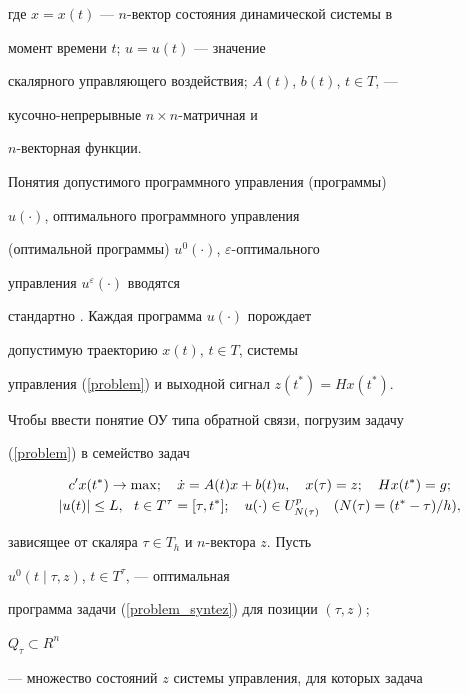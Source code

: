 где $x = x(t)$ --- $n$-вектор состояния динамической системы в


момент времени $t$; $u = u(t)$ --- значение


скалярного управляющего воздействия; $A(t)$, $b(t)$, $t \in T$, ---


кусочно-непрерывные $n \times n$-матричная и


$n$-векторная функции.





Понятия допустимого программного управления (программы)


$u(\cdot)$, оптимального програм\-много управления


(оптимальной программы) $u^0(\cdot)$, $\varepsilon$-оптимального


управления $u^\varepsilon(\cdot)$ вводятся


стандартно \cite{KMO2}. Каждая программа $u(\cdot)$ порождает


допустимую траекторию $x(t)$, $t \in T$, системы


управления (\ref{problem}) и выходной сигнал $z(t^*) = Hx(t^*)$.





Чтобы ввести понятие ОУ типа обратной связи, погрузим задачу


(\ref{problem}) в семейство задач


\begin{gather}


c' x(t^*) \to \max; \quad \Dot{x} = A(t)x + b(t)u, \quad x(\tau) =


z; \quad Hx(t^*) = g;\notag \\


%


\label{problem_syntez}


|u(t)| \le L, \ \ t \in T^\tau = [\tau, t^*]; \quad u(\cdot) \in


U^{p}_{N(\tau)} \quad (N(\tau) = (t^*-\tau)/h),


\end{gather}


зависящее от скаляра $\tau \in T_h$ и $n$-вектора $z$. Пусть


$u^0(t\mid\tau,z)$, $t \in T^\tau$, --- оптимальная


программа задачи (\ref{problem_syntez}) для позиции $(\tau,z)$;


$Q_\tau \subset R^{n}$


--- множество состояний $z$ системы управления, для которых задача


